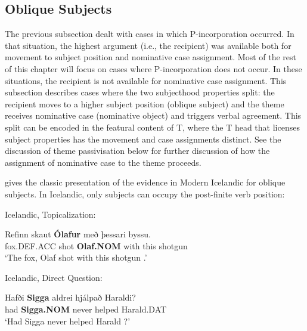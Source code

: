 \subsection{Oblique Subjects}
The previous subsection dealt with cases in which P-incorporation occurred. In that situation, the highest argument (i.e., the recipient) was available both for movement to subject position and nominative case assignment. Most of the rest of this chapter will focus on cases where P-incorporation does not occur. In these situations, the recipient is not available for nominative case assignment. This subsection describes cases where the two subjecthood properties split: the recipient moves to a higher subject position (oblique subject) and the theme receives nominative case (nominative object) and triggers verbal agreement. This split can be encoded in the featural content of T, where the T head that licenses subject properties has the movement and case assignments distinct. See the discussion of theme passivisation below for further discussion of how the assignment of nominative case to the theme proceeds.

\cite{Zaenen.1985} gives the classic presentation of the evidence in Modern Icelandic for oblique subjects. In Icelandic, only subjects can occupy the post-finite verb position:

\begin{exe}
	\ex Icelandic, Topicalization:\label{ex:ice-topic}
\begin{xlist}
	\ex \gll Refinn skaut \textbf{Ólafur} með  þessari byssu.\\
	fox.DEF.ACC shot \textbf{Olaf.NOM} with this shotgun\\
\trans `The fox, Olaf shot with this shotgun \citep[ex. 19a]{Zaenen.1985}.'
\end{xlist}
\ex Icelandic, Direct Question:\label{ex:ice-dq}
\begin{xlist}
	\ex \gll Hafði \textbf{Sigga} aldrei hjálpað Haraldi?\\
	had \textbf{Sigga.NOM} never helped Harald.DAT\\
\trans `Had Sigga never helped Harald \citep[ex. 20b]{Zaenen.1985}?'
\end{xlist}
\end{exe}

